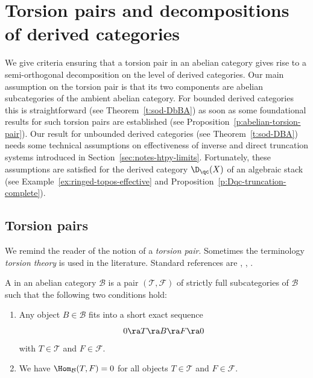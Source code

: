 \section{Torsion pairs and
decompositions of derived categories}
\label{sec:torsion-pairs-decomp}

We give criteria ensuring that a torsion pair in an abelian
category gives rise to a semi-orthogonal decomposition on the
level of derived categories. Our main assumption on the torsion
pair is that its two components are abelian subcategories of the
ambient abelian category. 
For bounded derived categories this is straightforward (see
Theorem~\ref{t:sod-DbBA}) as soon as some foundational results
for such torsion pairs are established (see
Proposition~\ref{p:abelian-torsion-pair}). Our result for
unbounded derived categories (see Theorem~\ref{t:sod-DBA}) needs
some technical assumptions on effectiveness of inverse and direct
truncation systems introduced in
Section~\ref{sec:notes-htpy-limits}. Fortunately, these
assumptions are satisfied for the derived category $\D_\qc(X)$ of
an algebraic stack (see Example~\ref{ex:ringed-topos-effective}
and Proposition~\ref{p:Dqc-truncation-complete}).


\subsection{Torsion pairs}
\label{sec:torsion-pairs}

We remind the reader of the notion of a \emph{torsion pair}. 
Sometimes
the terminology \emph{torsion theory} is used in the
literature. Standard references are
\cite[I.1]{beligiannis-reiten-torsion-theories},
\cite[1.12]{borceux-cat-2}, \cite{dickson-torsion}. 

\begin{definition}
  \label{d:torsion-pair}
  A  in an abelian category $\mathcal{B}$ is
  a pair 
  $(\mathcal{T}, \mathcal{F})$
  of strictly full subcategories of $\mathcal{B}$ such that the
  following two conditions hold:
  \begin{enumerate}[label=(TP{\arabic*})]
  \item 
    \label{enum:TP-ses}
    Any object $B \in \mathcal{B}$ fits into a short exact
    sequence
    \begin{equation*}
      0 \ra T \ra B \ra F \ra 0
    \end{equation*}
    with $T \in \mathcal{T}$ and $F \in \mathcal{F}$. 
  \item 
    \label{enum:TP-Hom-TF=0}
    We have $\Hom_\mathcal{B}(T, F)=0$ for all objects $T \in
    \mathcal{T}$ and $F \in \mathcal{F}$.
  \end{enumerate}
\end{definition}


